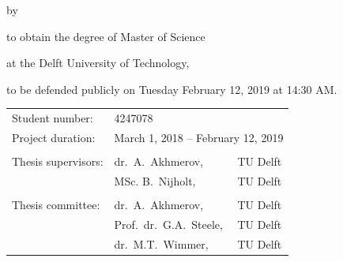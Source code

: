 \begin{titlepage}


\begin{center}


{\makeatletter
\largetitlestyle\fontsize{64}{94}\selectfont\@title
\makeatother}

{\makeatletter
\ifx\@subtitle\undefined\else
    \bigskip
   {\tudsffamily\fontsize{22}{32}\selectfont\@subtitle}    
\fi
\makeatother}

\bigskip
\bigskip

by

\bigskip
\bigskip

{\makeatletter
\largetitlestyle\fontsize{26}{26}\selectfont\@author
\makeatother}

\bigskip
\bigskip

to obtain the degree of Master of Science

at the Delft University of Technology,

to be defended publicly on Tuesday February 12, 2019 at 14:30 AM.

\vfill

\begin{tabular}{lll}
    Student number: & 4247078 \\
    Project duration: & \multicolumn{2}{l}{March 1, 2018 -- February 12, 2019} \\
    \\
    Thesis supervisors: & dr.\ A.\ Akhmerov, & TU Delft \\
                        & MSc. B.\ Nijholt, & TU Delft \\
    \\
    Thesis committee: & dr.\ A.\ Akhmerov, & TU Delft \\
                      & Prof.\ dr.\ G.A.\ Steele, & TU Delft \\
                      & dr.\ M.T.\ Wimmer, & TU Delft \\
\end{tabular}


\end{center}
\end{titlepage}
